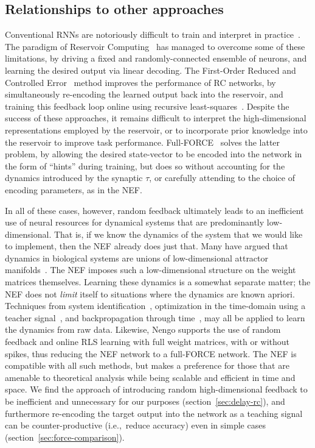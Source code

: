 \subsection{Relationships to other approaches}
\label{sec:relationships}

Conventional RNNs are notoriously difficult to train and interpret in practice~\citep{bengio1994learning}.
The paradigm of Reservoir Computing~\citep[RC;][]{jaeger2001echo, maass2002real} has managed to overcome some of these limitations, by driving a fixed and randomly-connected ensemble of neurons, and learning the desired output via linear decoding.
The First-Order Reduced and Controlled Error~\citep[FORCE;][]{sussillo2009generating} method improves the performance of RC networks, by simultaneously re-encoding the learned output back into the reservoir, and training this feedback loop online using recursive least-squares~\citep[RLS;][]{haykin1991adaptive}.
Despite the success of these approaches, it remains difficult to interpret the high-dimensional representations employed by the reservoir, or to incorporate prior knowledge into the reservoir to improve task performance.
Full-FORCE~\citep{depasquale2018full} solves the latter problem, by allowing the desired state-vector to be encoded into the network in the form of ``hints'' during training, but does so without accounting for the dynamics introduced by the synaptic $\tau$, or carefully attending to the choice of encoding parameters, as in the NEF.

In all of these cases, however, random feedback ultimately leads to an inefficient use of neural resources for dynamical systems that are predominantly low-dimensional.
That is, if we know the dynamics of the system that we would like to implement, then the NEF already does just that.
Many have argued that dynamics in biological systems are unions of low-dimensional attractor manifolds~\citep{sussillo2013opening, cunningham2014dimensionality, waernberg2017low}.
The NEF imposes such a low-dimensional structure on the weight matrices themselves.
Learning these dynamics is a somewhat separate matter; the NEF does not \emph{limit} itself to situations where the dynamics are known apriori.
Techniques from system identification~\citep{nelles2013nonlinear}, optimization in the time-domain using a teacher signal~\citep{duggins2017incorporating}, and backpropagation through time~\citep{rasmussen2018nengodl}, may all be applied to learn the dynamics from raw data.
Likewise, Nengo supports the use of random feedback and online RLS learning with full weight matrices, with or without spikes, thus reducing the NEF network to a full-FORCE network.
The NEF is compatible with all such methods, but makes a preference for those that are amenable to theoretical analysis while being scalable and efficient in time and space.
We find the approach of introducing random high-dimensional feedback to be inefficient and unnecessary for our purposes (section~\ref{sec:delay-rc}), and furthermore re-encoding the target output into the network as a teaching signal can be counter-productive (i.e.,~reduce accuracy) even in simple cases (section~\ref{sec:force-comparison}).

